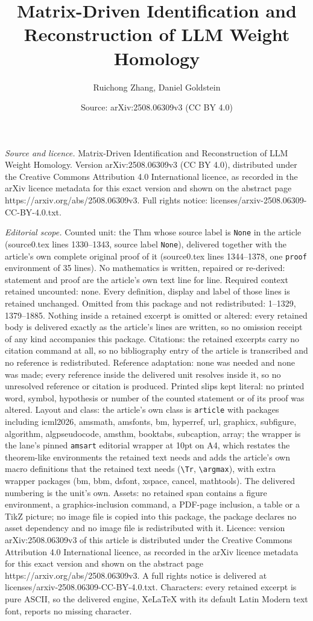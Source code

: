 \documentclass[10pt,a4paper]{amsart}
\title[Matrix-Driven Identification and Reconstruction of LLM Weigh]{Matrix-Driven Identification and Reconstruction of LLM Weight Homology}
\author{Ruichong Zhang, Daniel Goldstein}
\date{Source: arXiv:2508.06309v3 (CC BY 4.0)}
\begin{document}
\maketitle

\noindent\emph{Source and licence.} Matrix-Driven Identification and Reconstruction of LLM Weight Homology. Version arXiv:2508.06309v3 (CC BY 4.0), distributed under the Creative Commons Attribution 4.0 International licence, as recorded in the arXiv licence metadata for this exact version and shown on the abstract page https://arxiv.org/abs/2508.06309v3. Full rights notice: licenses/arxiv-2508.06309-CC-BY-4.0.txt.\par\smallskip

\noindent\textit{Editorial scope.} Counted unit: the Thm whose source label is \texttt{None} in the article (source0.tex lines 1330--1343, source label \texttt{None}), delivered together with the article's own complete original proof of it (source0.tex lines 1344--1378, one \texttt{proof} environment of 35 lines). No mathematics is written, repaired or re-derived: statement and proof are the article's own text line for line. Required context retained uncounted: none. Every definition, display and label of those lines is retained unchanged. Omitted from this package and not redistributed: 1--1329, 1379--1885. Nothing inside a retained excerpt is omitted or altered: every retained body is delivered exactly as the article's lines are written, so no omission receipt of any kind accompanies this package. Citations: the retained excerpts carry no citation command at all, so no bibliography entry of the article is transcribed and no reference is redistributed. Reference adaptation: none was needed and none was made; every reference inside the delivered unit resolves inside it, so no unresolved reference or citation is produced. Printed slips kept literal: no printed word, symbol, hypothesis or number of the counted statement or of its proof was altered. Layout and class: the article's own class is \texttt{article} with packages including icml2026, amsmath, amsfonts, bm, hyperref, url, graphicx, subfigure, algorithm, algpseudocode, amsthm, booktabs, subcaption, array; the wrapper is the lane's pinned \texttt{amsart} editorial wrapper at 10pt on A4, which restates the theorem-like environments the retained text needs and adds the article's own macro definitions that the retained text needs (\texttt{\textbackslash Tr}, \texttt{\textbackslash argmax}), with extra wrapper packages (bm, bbm, dsfont, xspace, cancel, mathtools). The delivered numbering is the unit's own. Assets: no retained span contains a figure environment, a graphics-inclusion command, a PDF-page inclusion, a table or a TikZ picture; no image file is copied into this package, the package declares no asset dependency and no image file is redistributed with it. Licence: version arXiv:2508.06309v3 of this article is distributed under the Creative Commons Attribution 4.0 International licence, as recorded in the arXiv licence metadata for this exact version and shown on the abstract page https://arxiv.org/abs/2508.06309v3. A full rights notice is delivered at licenses/arxiv-2508.06309-CC-BY-4.0.txt. Characters: every retained excerpt is pure ASCII, so the delivered engine, XeLaTeX with its default Latin Modern text font, reports no missing character.
\end{document}
